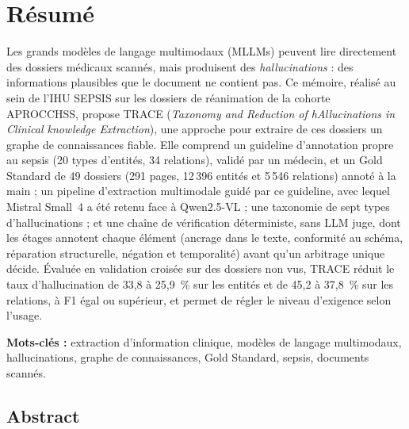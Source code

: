 \chapter*{Résumé}

Les grands modèles de langage multimodaux (MLLMs) peuvent lire directement des dossiers médicaux scannés, mais produisent des \emph{hallucinations} : des informations plausibles que le document ne contient pas. Ce mémoire, réalisé au sein de l'IHU SEPSIS sur les dossiers de réanimation de la cohorte APROCCHSS, propose TRACE (\textit{Taxonomy and Reduction of hAllucinations in Clinical knowledge Extraction}), une approche pour extraire de ces dossiers un graphe de connaissances fiable. Elle comprend un guideline d'annotation propre au sepsis (20 types d'entités, 34 relations), validé par un médecin, et un Gold Standard de 49 dossiers (291 pages, 12\,396 entités et 5\,546 relations) annoté à la main ; un pipeline d'extraction multimodale guidé par ce guideline, avec lequel Mistral Small~4 a été retenu face à Qwen2.5-VL ; une taxonomie de sept types d'hallucinations ; et une chaîne de vérification déterministe, sans LLM juge, dont les étages annotent chaque élément (ancrage dans le texte, conformité au schéma, réparation structurelle, négation et temporalité) avant qu'un arbitrage unique décide. Évaluée en validation croisée sur des dossiers non vus, TRACE réduit le taux d'hallucination de 33,8 à 25,9~\% sur les entités et de 45,2 à 37,8~\% sur les relations, à F1 égal ou supérieur, et permet de régler le niveau d'exigence selon l'usage.

\medskip
\noindent\textbf{Mots-clés :} extraction d'information clinique, modèles de langage multimodaux, hallucinations, graphe de connaissances, Gold Standard, sepsis, documents scannés.

\vspace{1.5cm}

\section*{Abstract}


